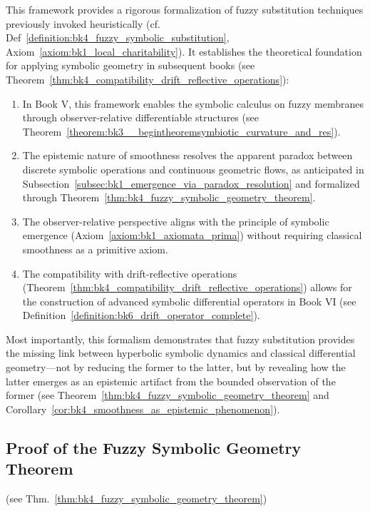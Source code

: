 \begin{remark}
\label{remark:bk4_fuzzy}
This framework provides a rigorous formalization of fuzzy substitution techniques previously invoked heuristically (cf. Def~\ref{definition:bk4_fuzzy_symbolic_substitution}, Axiom~\ref{axiom:bk1_local_charitability}). It establishes the theoretical foundation for applying symbolic geometry in subsequent books (see Theorem~\ref{thm:bk4_compatibility_drift_reflective_operations}):

\begin{enumerate}
    \item In Book V, this framework enables the symbolic calculus on fuzzy membranes through observer-relative differentiable structures (see Theorem~\ref{theorem:bk3__begintheoremsymbiotic_curvature_and_res}).
    
    \item The epistemic nature of smoothness resolves the apparent paradox between discrete symbolic operations and continuous geometric flows, as anticipated in Subsection~\ref{subsec:bk1_emergence_via_paradox_resolution} and formalized through Theorem~\ref{thm:bk4_fuzzy_symbolic_geometry_theorem}.
    
    \item The observer-relative perspective aligns with the principle of symbolic emergence (Axiom~\ref{axiom:bk1_axiomata_prima}) without requiring classical smoothness as a primitive axiom.
    
    \item The compatibility with drift-reflective operations (Theorem~\ref{thm:bk4_compatibility_drift_reflective_operations}) allows for the construction of advanced symbolic differential operators in Book VI (see Definition~\ref{definition:bk6_drift_operator_complete}).
\end{enumerate}

Most importantly, this formalism demonstrates that fuzzy substitution provides the missing link between hyperbolic symbolic dynamics and classical differential geometry—not by reducing the former to the latter, but by revealing how the latter emerges as an epistemic artifact from the bounded observation of the former (see Theorem~\ref{thm:bk4_fuzzy_symbolic_geometry_theorem} and Corollary~\ref{cor:bk4_smoothness_as_epistemic_phenomenon}).
\end{remark}

\subsection{Proof of the Fuzzy Symbolic Geometry Theorem} (see Thm.~\ref{thm:bk4_fuzzy_symbolic_geometry_theorem}) \label{subsec:bk4_proof_fuzzy_symbolic_geometry_theorem}

